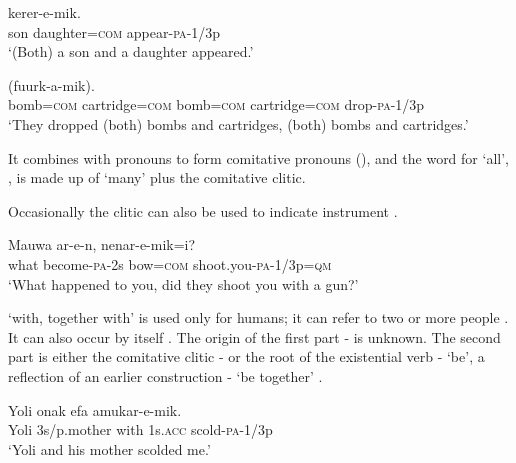 \ea%
\label{ex:3:x776}
\gll {}  kerer-e-mik. \\
son daughter=\textsc{com} appear-\textsc{pa}-1/3p\\
\glt`(Both) a son and a daughter appeared.'
\z

\ea%
\label{ex:3:x777}
\gll {}    (fuurk-a-mik). \\
bomb=\textsc{com} cartridge=\textsc{com} bomb=\textsc{com} cartridge=\textsc{com} drop-\textsc{pa}-1/3p\\
\glt`They dropped (both) bombs and cartridges, (both) bombs and cartridges.'
\z

It combines with pronouns to form comitative pronouns (), and the word for `all', , is made up of  `many' plus the comitative clitic.

Occasionally the clitic can also be used to indicate instrument . 

\ea%
\label{ex:3:x778}
\gll Mauwa ar-e-n,  nenar-e-mik=i? \\
what become-\textsc{pa}-2s bow=\textsc{com} shoot.you-\textsc{pa}-1/3p=\textsc{qm}\\
\glt`What happened to you, did they shoot you with a gun?'
\z

 `with, together with' is used only for humans; it can refer to two or more people . It can also occur by itself . The origin of the first part - is unknown. The second part is either the comitative clitic - or the root of the existential verb \nobreakdash- `be', a reflection of an earlier construction \nobreakdash- `be together' . 

\ea%
\label{ex:3:x821}
\gll Yoli onak  efa amukar-e-mik. \\
Yoli 3s/p.mother with 1s.\textsc{acc} scold-\textsc{pa}-1/3p\\
\glt`Yoli and his mother scolded me.'
\z

